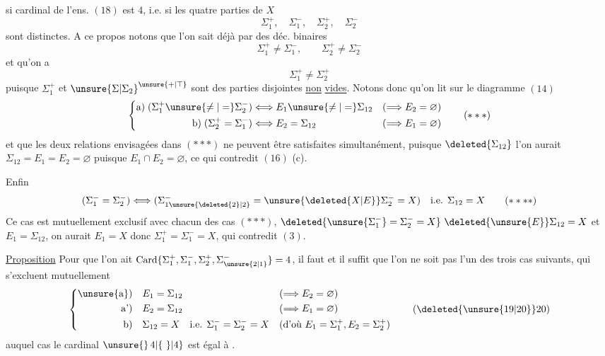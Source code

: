 \begingroup\makeatletter\tagsleft@true\makeatother
si  cardinal de l'ens. $(18)$ est $4$, i.e. si les quatre parties de $X$
\[
\Sigma_1^+,\quad\Sigma_1^-,\quad\Sigma_2^+,\quad\Sigma_2^-
\]
sont distinctes. A ce propos notons que l'on sait déjà par   des déc. binaires
\[
\Sigma_1^+\ne\Sigma_1^-,\qquad\Sigma_2^+\ne\Sigma_2^-
\tag*{($*$)}
\]
et qu'on a
\[
\Sigma_1^+\ne\Sigma_2^+
\tag*{($**$)}
\]
puisque $\Sigma_1^+$ et $\unsure{\Sigma|\Sigma_2}^{\unsure{+|\top}}$ sont des parties disjointes \uline{non} \uline{vides}. Notons donc qu'on lit sur le diagramme $(14)$
\[
\left\{\begin{aligned}
\text{a)}\;(\Sigma_1^+\unsure{\ne|=}\Sigma_2^-)&\Longleftrightarrow E_1\unsure{\ne|=}\Sigma_{12}
   &(\Longrightarrow E_2=\varnothing)\\
\text{b)}\;(\Sigma_2^+=\Sigma_1^-)&\Longleftrightarrow E_2=\Sigma_{12}
   &(\Longrightarrow E_1=\varnothing)
\end{aligned}\right.
\tag*{($***$)}
\]
et que les deux relations  envisagées dans $(***)$ ne peuvent être satisfaites simultanément, puisque $\deleted{\Sigma_{12}}$ l'on aurait $\Sigma_{12}=E_1=E_2=\varnothing$ puisque $E_1\cap E_2=\varnothing$, ce qui contredit $(16)$ (c).

Enfin
\[
(\Sigma_1^-=\Sigma_2^-)\Longleftrightarrow
(\Sigma_{1\unsure{\deleted{2}|2}}^-=\unsure{\deleted{X|E}}\Sigma_2^-=X)
\quad\text{i.e. }\Sigma_{12}=X
\tag*{($****$)}
\]
Ce cas est mutuellement exclusif avec chacun des cas $(***)$,   $\deleted{\unsure{\Sigma_1^-}=\Sigma_2^-=X}\ \deleted{\unsure{E}}\Sigma_{12}=X$ et $E_1=\Sigma_{12}$, on aurait $E_1=X$ donc $\Sigma_1^+=\Sigma_1^-=X$,  qui contredit $(3)$.

\uline{Proposition} Pour que l'on ait $\operatorname{Card}\{\Sigma_1^+,\Sigma_1^-,\Sigma_2^+,\Sigma_{\unsure{2|1}}^-\}=4$, il faut et il suffit que l'on ne soit pas l'un des trois cas suivants, qui s'excluent mutuellement
\[
\left\{\begin{aligned}
\text{\unsure{a})}\quad &E_1=\Sigma_{12}&&(\Longrightarrow E_2=\varnothing)\\
\text{a')}\quad &E_2=\Sigma_{12}&&(\Longrightarrow E_1=\varnothing)\\
\text{b)}\quad &\Sigma_{12}=X\quad\text{i.e. }\Sigma_1^-=\Sigma_2^-=X
   &&(\text{d'où }E_1=\Sigma_1^+,E_2=\Sigma_2^+)
\end{aligned}\right.
\tag*{(\deleted{\unsure{19|20}}20)}
\]
auquel cas le cardinal  $\unsure{\}\,4|\{\ \}|4}$ est égal à .

\endgroup
\clearpage
